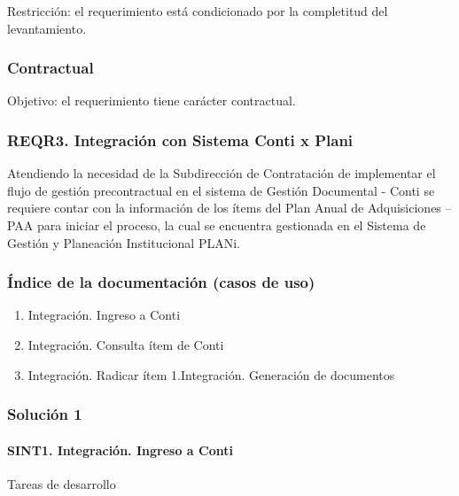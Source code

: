 \documentclass[
  paper=a4,
  ,captions=tableheading
]{scrartcl}
\providecommand{\tightlist}{%
  \setlength{\itemsep}{0pt}\setlength{\parskip}{0pt}}
\begin{document}
Restricción: el requerimiento está condicionado por la completitud del
levantamiento.

\subsubsection{Contractual}\label{sec:contractual}

Objetivo: el requerimiento tiene carácter contractual.

\subsubsection{REQR3. Integración con Sistema Conti x
Plani}\label{sec:reqr3.-integraciuxf3n-con-sistema-conti-x-plani}

Atendiendo la necesidad de la Subdirección de Contratación de
implementar el flujo de gestión precontractual en el sistema de Gestión
Documental - Conti se requiere contar con la información de los ítems
del Plan Anual de Adquisiciones -- PAA para iniciar el proceso, la cual
se encuentra gestionada en el Sistema de Gestión y Planeación
Institucional PLANi.

\subsubsection{Índice de la documentación (casos de
uso)}\label{sec:uxedndice-de-la-documentaciuxf3n-casos-de-uso}

\begin{enumerate}
\def\labelenumi{\arabic{enumi}.}
\tightlist
\item
  Integración. Ingreso a Conti
\item
  Integración. Consulta ítem de Conti
\item
  Integración. Radicar ítem 1.Integración. Generación de documentos
\end{enumerate}

\subsubsection{Solución 1}\label{sec:soluciuxf3n-1}

\paragraph{SINT1. Integración. Ingreso a
Conti}\label{sec:sint1.-integraciuxf3n.-ingreso-a-conti}

Tareas de desarrollo
\end{document}

